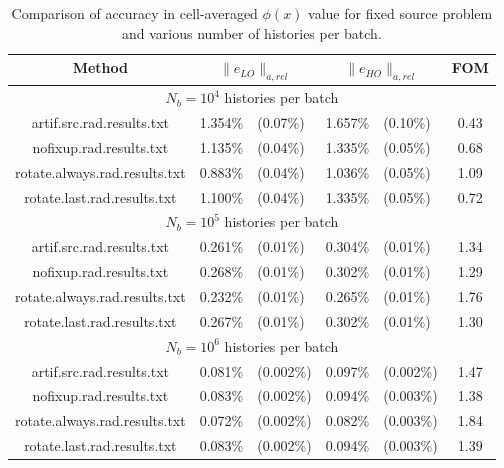 \begin{table}
    \begin{tabular}{|c|cl|cl|c|} \hline
        Method & \multicolumn{2}{|c|}{$\|e_{LO}\|_{a,rel}$} & 
        \multicolumn{2}{|c|}{$\|e_{HO}\|_{a,rel}$} &\multicolumn{1}{|c|}{FOM}
        \\ \hline 
        \multicolumn{6}{|c|}{$N_b = 10^4$ histories per batch} \\ \hline
     artif.src.rad.results.txt &1.354\%  & (0.07\%)  & 1.657\%  & (0.10\%) & 0.43  \\  
       nofixup.rad.results.txt &1.135\%  & (0.04\%)  & 1.335\%  & (0.05\%) & 0.68  \\  
 rotate.always.rad.results.txt &0.883\%  & (0.04\%)  & 1.036\%  & (0.05\%) & 1.09  \\  
   rotate.last.rad.results.txt &1.100\%  & (0.04\%)  & 1.335\%  & (0.05\%) & 0.72  \\ \hline 
   \multicolumn{6}{|c|}{$N_b = 10^5$ histories per batch} \\ \hline
     artif.src.rad.results.txt &0.261\%  & (0.01\%)  & 0.304\%  & (0.01\%) & 1.34  \\  
       nofixup.rad.results.txt &0.268\%  & (0.01\%)  & 0.302\%  & (0.01\%) & 1.29  \\  
 rotate.always.rad.results.txt &0.232\%  & (0.01\%)  & 0.265\%  & (0.01\%) & 1.76  \\  
   rotate.last.rad.results.txt &0.267\%  & (0.01\%)  & 0.302\%  & (0.01\%) & 1.30  \\ \hline 
   \multicolumn{6}{|c|}{$N_b = 10^6$ histories per batch} \\ \hline
     artif.src.rad.results.txt &0.081\%  & (0.002\%)  & 0.097\%  & (0.002\%) & 1.47  \\  
       nofixup.rad.results.txt &0.083\%  & (0.002\%)  & 0.094\%  & (0.003\%) & 1.38  \\  
 rotate.always.rad.results.txt &0.072\%  & (0.002\%)  & 0.082\%  & (0.003\%) & 1.84  \\  
   rotate.last.rad.results.txt &0.083\%  & (0.002\%)  & 0.094\%  & (0.003\%) & 1.39  \\ \hline 
    \end{tabular}
    \caption{\label{tab:fixed_source_accuracy} Comparison of accuracy in cell-averaged $\phi(x)$ value for
fixed source problem and various number of histories per batch.}
\end{table}


